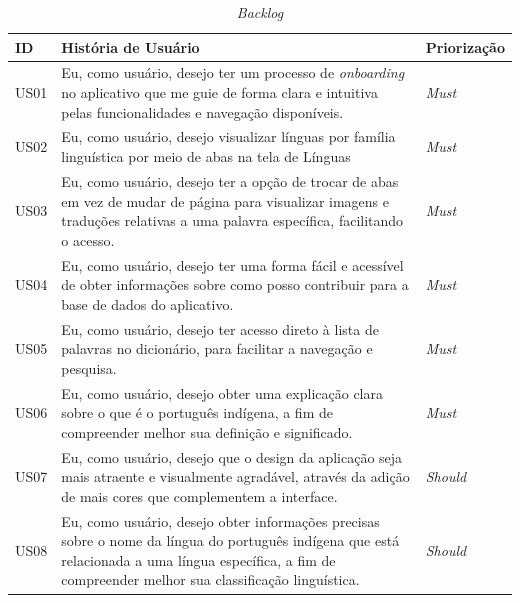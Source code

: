 \begin{table}[h!]
	\centering
	\caption{\textit{Backlog}}
	\label{tab08}
	\begin{tabularx}{\textwidth}{p{1cm}|p{12cm}|p{1cm}}
	\hline
	ID   & História de Usuário                                                                                                                                                                                                   & Priorização \\ \hline
	US01 & Eu, como usuário, desejo ter um processo de \textit{onboarding} no aplicativo que me guie de forma clara e intuitiva pelas funcionalidades e navegação disponíveis.                                                            & \textit{Must}        \\
	US02 & Eu, como usuário, desejo visualizar línguas por família linguística por meio de abas na tela de Línguas                                                                                                               & \textit{Must}        \\
	US03 & Eu, como usuário, desejo ter a opção de trocar de abas em vez de mudar de página para visualizar imagens e traduções relativas a uma palavra específica, facilitando o acesso.                                        & \textit{Must}        \\
	US04 & Eu, como usuário, desejo ter uma forma fácil e acessível de obter informações sobre como posso contribuir para a base de dados do aplicativo.                                                                         & \textit{Must}        \\
	US05 & Eu, como usuário, desejo ter acesso direto à lista de palavras no dicionário, para facilitar a navegação e pesquisa.																									 & \textit{Must}        \\
	US06 & Eu, como usuário, desejo obter uma explicação clara sobre o que é o português indígena, a fim de compreender melhor sua definição e significado.                                                                      & \textit{Must}        \\
	US07 & Eu, como usuário, desejo que o design da aplicação seja mais atraente e visualmente agradável, através da adição de mais cores que complementem a interface.                                                          & \textit{Should}      \\
	US08 & Eu, como usuário, desejo obter informações precisas sobre o nome da língua do português indígena que está relacionada a uma língua específica, a fim de compreender melhor sua classificação linguística. 			 & \textit{Should}      \\

\end{tabularx}
\end{table}
